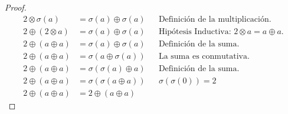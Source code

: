 \documentclass[11pt,letterpaper]{article}
\begin{document}
\begin{proof}
\begin{align}
2 \otimes \sigma(a) &= \sigma(a) \oplus \sigma(a) && \text{Definición de la multiplicación.} \\
2 \oplus (2 \otimes a) &= \sigma(a) \oplus \sigma(a) && \text{Hipótesis Inductiva: $2 \otimes a = a \oplus a$.} \\
2 \oplus (a \oplus a) &= \sigma(a) \oplus \sigma(a) && \text{Definición de la suma.} \\
2 \oplus (a \oplus a) &= \sigma(a \oplus \sigma(a)) && \text{La suma es conmutativa.} \\
2 \oplus (a \oplus a) &= \sigma(\sigma(a) \oplus a) && \text{Definición de la suma.} \\
2 \oplus (a \oplus a) &= \sigma(\sigma(a \oplus a)) && \text{$\sigma(\sigma(0)) = 2$} \\
2 \oplus (a \oplus a) &= 2 \oplus (a \oplus a)
\end{align}
\end{proof}
\end{document}
